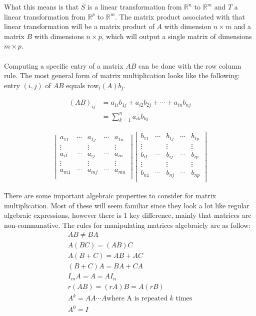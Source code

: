 \documentclass[11pt, a4paper]{article}
\begin{document}
What this means is that $S$ is a linear transformation from $\mathbb{R}^n$ to $\mathbb{R}^m$ and $T$ a linear transformation from
$\mathbb{R}^p$ to $\mathbb{R}^m$. The matrix product associated with that linear transformation will be a matrix product of $A$ with dimension $n \times m$ and a matrix
$B$ with dimensions $n \times p$, which will output a single matrix of dimensions $m \times p$.
\\
\\
Computing a specific entry of a matrix $AB$ can be done with the row column rule. The most general form of matrix multiplication looks like the following:
entry $(i, j)$ of $AB$ equals $\text{row}_i(A)b_j$.

\begin{align*}
  (AB)_{ij} &= a_{1i}b_{1j} + a_{i2}b_{2j} + \cdots + a_{in}b_{nj}\\
            &= \sum_{k=1}^{n} a_{ik}b_{kj}
\end{align*}

\begin{align*}
  \begin{bmatrix}
    a_{11} & \cdots & a_{1j} & \cdots & a_{1n}\\
    \vdots & \,     & \vdots & \,     & \vdots\\
    a_{i1} & \cdots & a_{ij} & \cdots & a_{in}\\
    \vdots & \,     & \vdots & \,     & \vdots\\
    a_{m1} & \cdots & a_{mj} & \cdots & a_{mn}\\
  \end{bmatrix}
  \begin{bmatrix}
    b_{11} & \cdots & b_{1j} & \cdots & b_{1p}\\
    \vdots & \,     & \vdots & \,     & \vdots\\
    b_{i1} & \cdots & b_{ij} & \cdots & b_{ip}\\
    \vdots & \,     & \vdots & \,     & \vdots\\
    b_{n1} & \cdots & b_{nj} & \cdots & b_{np}\\
  \end{bmatrix}
\end{align*}

There are some important algebraic properties to consider for matrix multiplication.
Most of these will seem familiar since they look a lot like regular algebraic expressions, however there is
1 key difference, mainly that matrices are non-communative. The rules for manipulating matrices algebraicly are as follow:
\begin{gather}
  AB \neq BA\\
  A(BC) = (AB)C\\
  A(B+C) = AB + AC\\
  (B+C)A = BA + CA\\
  I_mA = A = AI_n\\
  r(AB) = (rA)B = A(rB)\\
  A^k = AA \cdots A \text{where A is repeated $k$ times}\\
  A^0 = I
\end{gather}
\end{document}
